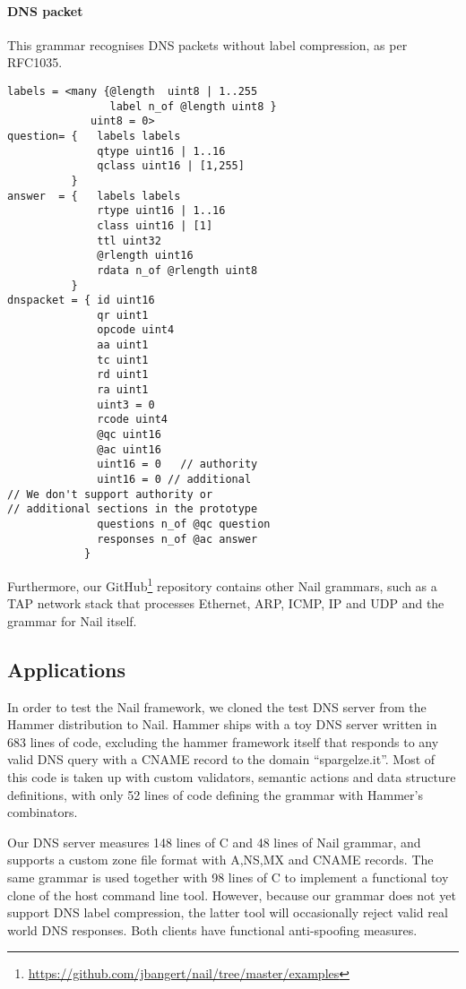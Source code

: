 \paragraph{DNS packet}
This grammar recognises DNS packets without label compression, as per RFC1035.
\begin{verbatim}
labels = <many {@length  uint8 | 1..255 
                label n_of @length uint8 }
             uint8 = 0>
question= {   labels labels
              qtype uint16 | 1..16 
              qclass uint16 | [1,255]
          }
answer  = {   labels labels
              rtype uint16 | 1..16
              class uint16 | [1]
              ttl uint32
              @rlength uint16 
              rdata n_of @rlength uint8 
          }
dnspacket = { id uint16
              qr uint1
              opcode uint4
              aa uint1 
              tc uint1
              rd uint1
              ra uint1
              uint3 = 0
              rcode uint4
              @qc uint16
              @ac uint16
              uint16 = 0   // authority 
              uint16 = 0 // additional
// We don't support authority or 
// additional sections in the prototype
              questions n_of @qc question         
              responses n_of @ac answer
            }
\end{verbatim}
  
Furthermore, our GitHub\footnote{\url{https://github.com/jbangert/nail/tree/master/examples}}
repository contains other Nail grammars, such as a TAP network stack that processes Ethernet, ARP,
ICMP, IP and UDP and the grammar for Nail itself. 

\subsection{Applications}

In order to test the Nail framework, we cloned the test DNS server from the Hammer distribution to
Nail. Hammer ships with a toy DNS server written in 683 lines of code, excluding the hammer
framework itself that responds to any valid DNS query with a CNAME record to the domain
``spargelze.it''.  Most of this code is taken up with custom validators, semantic actions and data
structure definitions, with only 52 lines of code defining the grammar with Hammer's combinators.

Our DNS server measures 148 lines of C and 48 lines of Nail grammar, and supports a custom zone file format
with A,NS,MX and CNAME records. The same grammar is used together with 98 lines of C to implement a
functional toy clone of the host command line tool. However, because our grammar does not yet
support DNS label compression, the latter tool will occasionally reject valid real world DNS
responses. Both clients have functional anti-spoofing measures.

